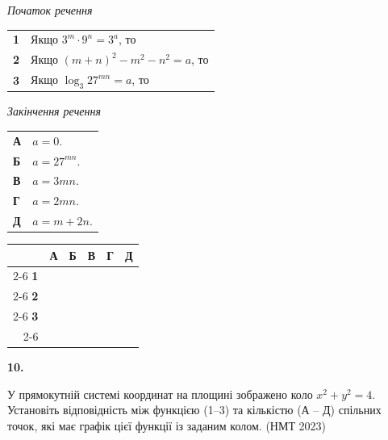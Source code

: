 \documentclass[14pt]{extarticle}
\newcommand{\answerGrid}{
    \begingroup
    \setlength{\tabcolsep}{4pt}
    \renewcommand{\arraystretch}{1.2}
    \small
    \begin{tabular}{r|c|c|c|c|c|}
         \multicolumn{1}{c}{} & \multicolumn{1}{c}{\textbf{А}} & \multicolumn{1}{c}{\textbf{Б}} & \multicolumn{1}{c}{\textbf{В}} & \multicolumn{1}{c}{\textbf{Г}} & \multicolumn{1}{c}{\textbf{Д}} \\ \cline{2-6}
         \textbf{1} & & & & & \\ \cline{2-6}
         \textbf{2} & & & & & \\ \cline{2-6}
         \textbf{3} & & & & & \\ \cline{2-6}
    \end{tabular}
    \endgroup
}
\newcommand{\nmtyear}[1]{\hfill{\small\color{yearcolor}(НМТ #1)}}
\begin{document}
\noindent
\begin{minipage}[t]{0.55\textwidth}
    \textit{Початок речення} \par \vspace{0.2cm}
    \begin{tabular}{@{}p{0.5cm} l@{}}
    \textbf{1} & \colorbox{yellow!30}{Якщо $3^m \cdot 9^n = 3^a$, то} \\[0.4cm]
    \textbf{2} & Якщо $(m + n)^2 - m^2 - n^2 = a$, то \\[0.4cm]
    \textbf{3} & Якщо $\log_3 27^{mn} = a$, то \\
    \end{tabular}
\end{minipage}%
\hfill
\begin{minipage}[t]{0.40\textwidth}
    \textit{Закінчення речення} \par \vspace{0.2cm}
    \begin{tabular}{@{}p{0.5cm} p{6cm}@{}}
    \textbf{А} & $a = 0$. \\[0.2cm]
    \textbf{Б} & $a = 27^{mn}$. \\[0.2cm]
    \textbf{В} & $a = 3mn$. \\[0.2cm]
    \textbf{Г} & $a = 2mn$. \\[0.2cm]
    \textbf{Д} & $a = m + 2n$. \\
    \end{tabular}
\end{minipage}
\vspace{0.3cm}

\answerGrid
\vspace{0.7cm}

\noindent\textbf{10.} \begin{minipage}[t]{0.55\textwidth}
У прямокутній системі координат на площині зображено коло $x^2+y^2=4$. Установіть відповідність між функцією (1–3) та кількістю (А – Д) спільних точок, які має графік цієї функції із заданим колом. \nmtyear{2023}
\end{minipage}
\hfill
\begin{minipage}[t]{0.4\textwidth}
    \vspace{-0.5cm}
    \begin{flushright}
    \end{flushright}
\end{minipage}
\end{document}
